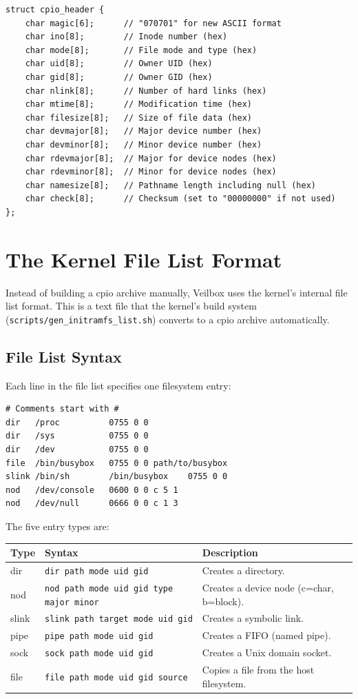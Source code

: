 \begin{lstlisting}
struct cpio_header {
    char magic[6];      // "070701" for new ASCII format
    char ino[8];        // Inode number (hex)
    char mode[8];       // File mode and type (hex)
    char uid[8];        // Owner UID (hex)
    char gid[8];        // Owner GID (hex)
    char nlink[8];      // Number of hard links (hex)
    char mtime[8];      // Modification time (hex)
    char filesize[8];   // Size of file data (hex)
    char devmajor[8];   // Major device number (hex)
    char devminor[8];   // Minor device number (hex)
    char rdevmajor[8];  // Major for device nodes (hex)
    char rdevminor[8];  // Minor for device nodes (hex)
    char namesize[8];   // Pathname length including null (hex)
    char check[8];      // Checksum (set to "00000000" if not used)
};
\end{lstlisting}

\section{The Kernel File List Format}

Instead of building a cpio archive manually, Veilbox uses the kernel's
internal file list format. This is a text file that the kernel's build
system (\texttt{scripts/gen\_initramfs\_list.sh}) converts to a cpio
archive automatically.

\subsection{File List Syntax}

Each line in the file list specifies one filesystem entry:

\begin{lstlisting}
# Comments start with #
dir   /proc          0755 0 0
dir   /sys           0755 0 0
dir   /dev           0755 0 0
file  /bin/busybox   0755 0 0 path/to/busybox
slink /bin/sh        /bin/busybox    0755 0 0
nod   /dev/console   0600 0 0 c 5 1
nod   /dev/null      0666 0 0 c 1 3
\end{lstlisting}

The five entry types are:

\begin{longtable}{|p{2cm}|p{4cm}|p{6cm}|}
\hline
\textbf{Type} & \textbf{Syntax} & \textbf{Description} \\
\hline
dir & \texttt{dir path mode uid gid} & Creates a directory. \\
nod & \texttt{nod path mode uid gid type major minor} & Creates a device node (c=char, b=block). \\
slink & \texttt{slink path target mode uid gid} & Creates a symbolic link. \\
pipe & \texttt{pipe path mode uid gid} & Creates a FIFO (named pipe). \\
sock & \texttt{sock path mode uid gid} & Creates a Unix domain socket. \\
file & \texttt{file path mode uid gid source} & Copies a file from the host filesystem. \\
\hline
\end{longtable}

